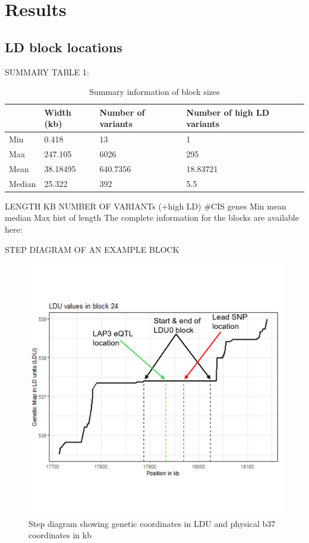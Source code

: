 \documentclass{article}
\begin{document}
\section{Results}
\subsection{LD block locations}


SUMMARY TABLE 1:
\begin{table}[h]
\begin{tabular}{|l|l|l|l|}
\hline
       & Width (kb) & Number of variants & Number of high LD variants \\ \hline
Min    & 0.418      & 13                 & 1                          \\ \hline
Max    & 247.105    & 6026               & 295                        \\ \hline
Mean   & 38.18495   & 640.7356           & 18.83721                   \\ \hline
Median & 25.322     & 392                & 5.5                        \\ \hline
\end{tabular}
\caption{Summary information of block sizes}
\end{table}
LENGTH KB  NUMBER OF VARIANTs (+high LD)  #CIS genes
Min
mean
median
Max
hist of length
The complete information for the blocks are available here:


STEP DIAGRAM OF AN EXAMPLE BLOCK
\newpage
\begin{figure}[hbt!]
    \centering
    \includegraphics[width=1\linewidth]{Thesis/thesis images/exampleblock.png}
    \caption{Step diagram showing genetic coordinates in LDU and physical b37 coordinates in kb}
    \label{fig:enter-label}
\end{figure}
\end{document}
